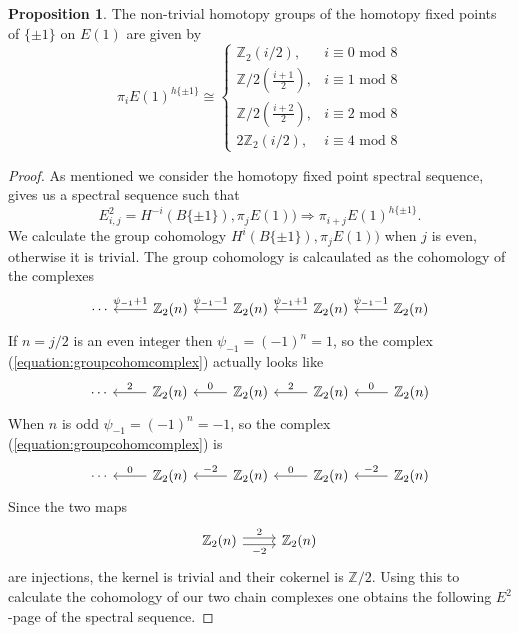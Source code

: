 \documentclass[a4paper]{article} %
\theoremstyle{definition}
\newtheorem{proposition}[theorem]{Proposition}
\newcommand{\Z}{\mathbb{Z}}
\renewcommand{\implies}{\Rightarrow}    %
\begin{document}
\begin{proposition}\label{proposition:homotopypm1}
  The non-trivial homotopy groups of the homotopy fixed points of $\{\pm 1\}$ on $E(1)$ are given by
  \[
    \pi_iE(1)^{h\{\pm 1\}} \cong
    \begin{cases}
      \Z_2 (i /2), & i \equiv 0 \text{ mod } 8 \\
      \Z/2 (\frac{i+1}{2}), & i \equiv 1 \text{ mod } 8 \\
      \Z/2 (\frac{i+2}{2}), & i \equiv 2 \text{ mod } 8 \\
      2 \Z_2 (i/2), & i \equiv 4 \text{ mod } 8
    \end{cases}
  \]
\end{proposition}
\begin{proof}
As mentioned we consider the homotopy fixed point spectral sequence, gives us a spectral sequence such that
\[
E^2_{i,j} = H^{-i}(B\{\pm 1\}), \pi_j E(1)) \implies \pi_{i+j}E(1)^{h \{\pm 1\}}.
\]
We calculate the group cohomology $H^{i}(B\{\pm 1\}), \pi_j E(1))$ when $j$ is even, otherwise it is trivial. The group cohomology is calcaulated as the cohomology of the complexes
\begin{equation}\label{equation:groupcohomcomplex}
  \begin{tikzcd}
    \cdots & \Z_2(n) \lar[swap]{\psi_{-1} + 1} & \Z_2(n) \lar[swap]{\psi_{-1} - 1}  & \Z_2 (n) \lar[swap]{\psi_{-1} + 1}  & \Z_2 (n) \lar[swap]{\psi_{-1} - 1}
  \end{tikzcd}
\end{equation}
If $n = j/2$ is an even integer then $\psi_{-1} = (-1)^{n} = 1$, so the complex (\ref{equation:groupcohomcomplex}) actually looks like
\[
\begin{tikzcd}
  \cdots & \Z_2(n) \lar[swap]{2} & \Z_2(n) \lar[swap]{0}  & \Z_2 (n) \lar[swap]{2}  & \Z_2 (n) \lar[swap]{0}
\end{tikzcd}
\]
When $n$ is odd $\psi_{-1} = (-1)^n = -1$, so the complex (\ref{equation:groupcohomcomplex}) is
\[
\begin{tikzcd}
  \cdots & \Z_2(n) \lar[swap]{0} & \Z_2(n) \lar[swap]{-2}  & \Z_2 (n) \lar[swap]{0}  & \Z_2 (n) \lar[swap]{-2}
\end{tikzcd}
\]
Since the two maps
\[
\begin{tikzcd}
  \Z_2(n)  \arrow[r, "2", shift left]  \arrow[r, "-2", shift right, swap] & \Z_2(n)
\end{tikzcd}
\]
are injections, the kernel is trivial and their cokernel is $\Z/2$. Using this to calculate the cohomology of our two chain complexes one obtains the following $E^2$-page of the spectral sequence.

\end{proof}
\end{document}
